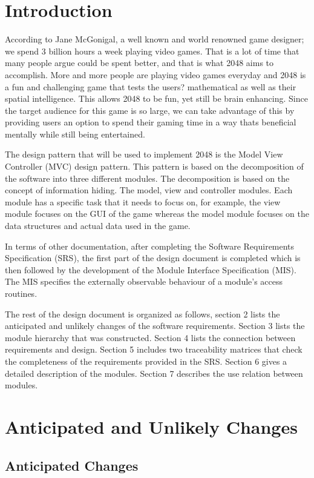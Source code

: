 \documentclass[12pt]{article}
\begin{document}
\section{Introduction}
According to Jane McGonigal, a well known and world renowned game 
designer; we spend 3 billion hours a week playing video games. That is a lot of 
time that many people argue could be spent better, and that is what 2048 aims to 
accomplish. More and more people are playing video games everyday and 
2048 is a fun and challenging game that tests the users? mathematical as well as 
their spatial intelligence. This allows 2048 to be fun, yet still be brain 
enhancing. Since the target audience for this game is so large, we can take 
advantage of this by providing users an option to spend their gaming time in a way 
thats beneficial mentally while still being entertained. \par
The design pattern that will be used to implement 2048 is the Model View Controller (MVC) design pattern. This pattern is based on the decomposition of the software into three different modules. The decomposition is based on the concept of information hiding. The model, view and controller modules. Each module has a specific task that it needs to focus on, for example, the view module focuses on the GUI of the game whereas the model module focuses on the data structures and actual data used in the game. \par
In terms of other documentation, after completing the Software Requirements Specification (SRS), the first part of the design document is completed which is then followed by the development of the Module Interface Specification (MIS). The MIS specifies the externally observable behaviour of a module's access routines. \par
The rest of the design document is organized as follows, section 2 lists the anticipated and unlikely changes of the software requirements. Section 3 lists the module hierarchy that was constructed. Section 4 lists the connection between requirements and design. Section 5 includes two traceability matrices that check the completeness of the requirements provided in the SRS. Section 6 gives a detailed description of the modules. Section 7 describes the use relation between modules. 

\section{Anticipated and Unlikely Changes}

\subsection{Anticipated Changes}
\end{document}
